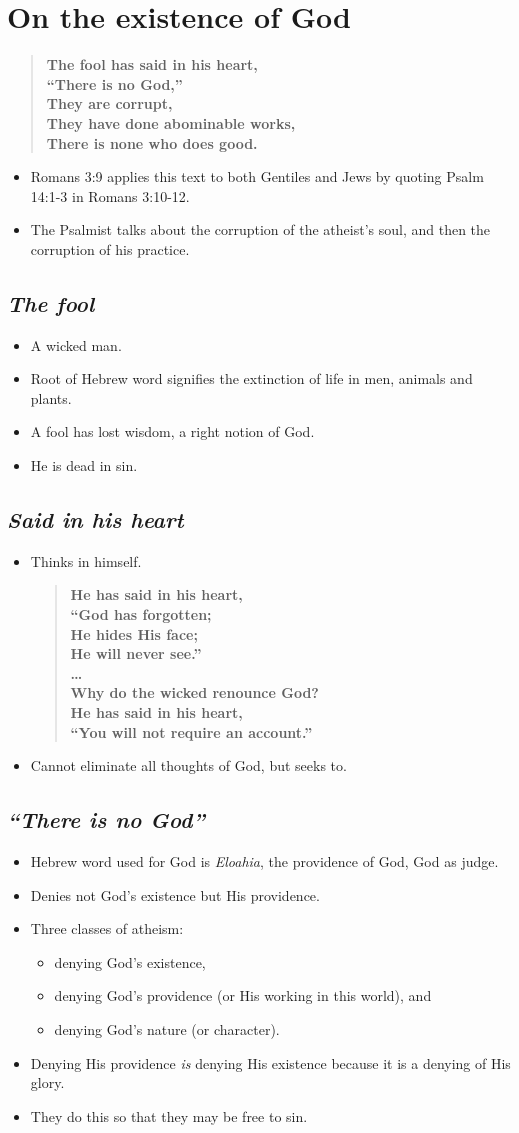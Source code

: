 \documentclass{article}
\newcommand{\BI}{\begin{itemize}\item}
\newcommand{\EI}{\end{itemize}}
\newcommand{\I}{\item}
\newcommand{\Q}[2]{\begin{quote} \textbf{#2 \center{#1}}\end{quote}}
\begin{document}
\section{On the existence of God}
\Q{Psalm 14:1}
    {The fool has said in his heart,\\
    ``There is no God,''\\
    They are corrupt, \\
    They have done abominable works, \\
    There is none who does good.}
\BI Romans 3:9 applies this text to both Gentiles and Jews
    by quoting Psalm 14:1-3 in Romans 3:10-12.
\I  The Psalmist talks about the corruption of the atheist's soul,
    and then the corruption of his practice.  \EI

\subsection{\emph{The fool}}
\BI A wicked man.
\I  Root of Hebrew word signifies the extinction of life
    in men, animals and plants.
\I  A fool has lost wisdom, a right notion of God.
\I  He is dead in sin. \EI

\subsection{\emph{Said in his heart}}
\BI Thinks in himself.
    \Q{Psalm 10:11,13}
    {He has said in his heart, \\
    ``God has forgotten; \\
    He hides His face; \\
    He will never see.'' \\
    \ldots \\
    Why do the wicked renounce God? \\
    He has said in his heart, \\
    ``You will not require an account.''}

\I  Cannot eliminate all thoughts of God, but seeks to. \EI

\subsection{\emph{``There is no God''}}
\BI Hebrew word used for God is \emph{Eloahia},
    the providence of God, God as judge.
\I  Denies not God's existence but His providence.
\I  Three classes of atheism:
    \BI denying God's existence,
    \I  denying God's providence (or His working in this world), and 
    \I  denying God's nature (or character). \EI
\I  Denying His providence \emph{is} denying His existence
    because it is a denying of His glory.
\I  They do this so that they may be free to sin. \EI
\end{document}
